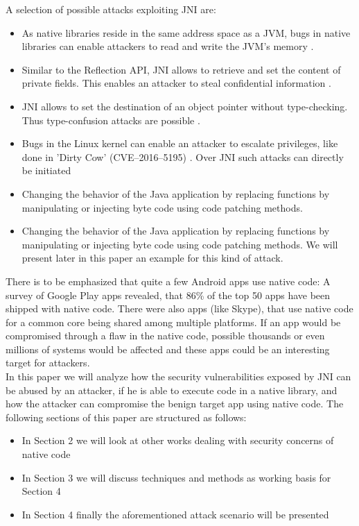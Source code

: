 A selection of possible attacks exploiting JNI are:
\begin{itemize}
\item As native libraries reside in the same address space as a JVM, bugs in native
libraries can enable attackers to read and write the JVM's memory \cite[p. 3]{Sun_jvm-portablesandboxing}. %
	\item  Similar to the Reflection API, JNI allows to retrieve and set the content of private fields. This enables an attacker to steal confidential information \cite[p. 3]{Sun_jvm-portablesandboxing}.
	\item JNI allows to set the destination of an object pointer without type-checking. Thus type-confusion attacks are possible \cite[p. 4]{Sun_jvm-portablesandboxing}. %
	\item Bugs in the Linux kernel can enable an attacker to escalate privileges, like done in 'Dirty Cow' (CVE--2016--5195) \cite{DirtyCow}. Over JNI such attacks can directly be initiated
    \item Changing the behavior of the Java application by replacing functions by manipulating or injecting byte code using code patching methods.
	\item Changing the behavior of the Java application by replacing functions by manipulating or injecting byte code using code patching methods.
	We will present later in this paper an example for this kind of attack.
\end{itemize}


There is to be emphasized that quite a few Android apps use native code: A survey of Google Play apps \cite[p. 3]{Sun:2014:NPA:2627393.2627396} revealed, that 86\% of the top 50 apps have been shipped with native code. There were also apps (like Skype), that use native code for a common core being shared among multiple platforms. If an app would be compromised through a flaw in the native code, possible thousands or even millions of systems would be affected and these apps could be an interesting target for attackers.\\


In this paper we will analyze how the security vulnerabilities exposed by JNI can be abused by an attacker, if he is able to execute code in a native library, and how the attacker can compromise the benign target app using native code.
The following sections of this paper are structured as follows: 
\begin{itemize}
\item In Section 2 we will look at other works dealing with
security concerns of native code
\item In Section 3 we will discuss techniques and methods as working basis for Section 4
\item In Section 4 finally the aforementioned attack scenario will be presented
\end{itemize}


